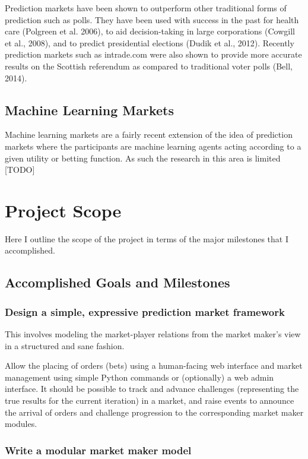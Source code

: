 \documentclass[bsc,frontabs,twoside,singlespacing,parskip,deptreport]{infthesis}     %
\begin{document}
	Prediction markets have been shown to outperform other traditional forms of prediction such as polls. They have been used with success in the past for health care (Polgreen et al. 2006), to aid decision-taking in large corporations (Cowgill et al., 2008), and to predict presidential elections (Dudik et al., 2012). Recently prediction markets such as intrade.com were also shown to provide more accurate results on the Scottish referendum as compared to traditional voter polls (Bell, 2014).

\section{Machine Learning Markets}
	Machine learning markets are a fairly recent extension of the idea of prediction markets where the participants are machine learning agents acting according to a given utility or betting function. As such the research in this area is limited 
	[TODO]

\chapter{Project Scope}
	Here I outline the scope of the project in terms of the major milestones that I accomplished. 



\section{Accomplished Goals and Milestones}	

\subsection{Design a simple, expressive prediction market framework}
	This involves modeling the market-player relations from the market maker’s view in a structured and sane fashion. 

Allow the placing of orders (bets) using a human-facing web interface and market management using simple Python commands or (optionally) a web admin interface. It should be possible to track and advance challenges (representing the true results for the current iteration) in a market, and raise events to announce the arrival of orders and challenge progression to the corresponding market maker modules. 

\subsection{Write a modular market maker model}
\end{document}
